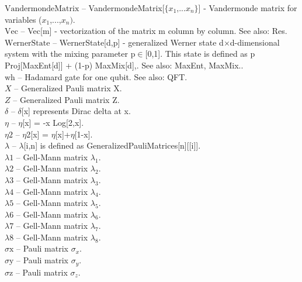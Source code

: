\documentclass[a4paper,10pt]{scrartcl}
\begin{document}
\textbf{$ \text{VandermondeMatrix} $ }-- VandermondeMatrix[$\{$$ x_1\text{,...}x_n $$\}$] - Vandermonde matrix for variables ($ x_1 $,...,$ x_n\text{).} $\\

\textbf{$ \text{Vec} $ }-- Vec[m] - vectorization of the matrix m column by column. See also: Res.$  $\\

\textbf{$ \text{WernerState} $ }-- WernerState[d,p] - generalized Werner state d$\times $d-dimensional system with the mixing parameter p$\in $[0,1]. This state is defined as p Proj[MaxEnt[d]] + (1-p) MaxMix[d],. See also: MaxEnt, MaxMix..$  $\\

\textbf{$ \text{wh} $ }-- Hadamard gate for one qubit. See also: QFT.$  $\\

\textbf{$ X $ }-- Generalized Pauli matrix X.$  $\\

\textbf{$ Z $ }-- Generalized Pauli matrix Z.$  $\\

\textbf{$ \delta  $ }-- $\delta $[x] represents Dirac delta at x.$  $\\

\textbf{$ \eta  $ }-- $\eta $[x] = -x Log[2,x].$  $\\

\textbf{$ \text{$\eta $2} $ }-- $\eta $2[x] = $\eta $[x]+$\eta $[1-x].$  $\\

\textbf{$ \lambda  $ }-- $\lambda $[i,n] is defined as GeneralizedPauliMatrices[n][[i]].$  $\\

\textbf{$ \text{$\lambda $1} $ }-- Gell-Mann matrix $ \lambda _1. $\\

\textbf{$ \text{$\lambda $2} $ }-- Gell-Mann matrix $ \lambda _2. $\\

\textbf{$ \text{$\lambda $3} $ }-- Gell-Mann matrix $ \lambda _3. $\\

\textbf{$ \text{$\lambda $4} $ }-- Gell-Mann matrix $ \lambda _4. $\\

\textbf{$ \text{$\lambda $5} $ }-- Gell-Mann matrix $ \lambda _5. $\\

\textbf{$ \text{$\lambda $6} $ }-- Gell-Mann matrix $ \lambda _6. $\\

\textbf{$ \text{$\lambda $7} $ }-- Gell-Mann matrix $ \lambda _7. $\\

\textbf{$ \text{$\lambda $8} $ }-- Gell-Mann matrix $ \lambda _8. $\\

\textbf{$ \text{$\sigma $x} $ }-- Pauli matrix $ \sigma _x. $\\

\textbf{$ \text{$\sigma $y} $ }-- Pauli matrix $ \sigma _y. $\\

\textbf{$ \text{$\sigma $z} $ }-- Pauli matrix $ \sigma _z. $\\
\end{document}
